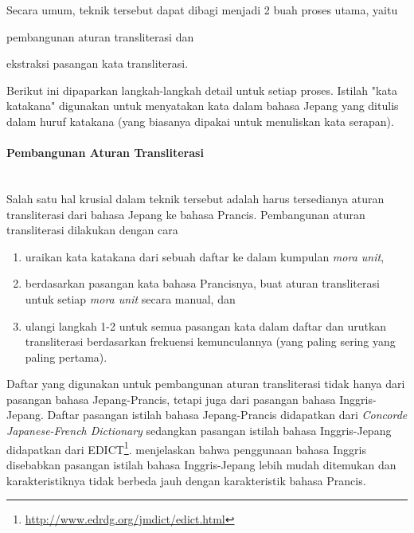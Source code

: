 \documentclass[../main/main.tex]{subfiles}
\begin{document}
Secara umum, teknik tersebut dapat dibagi menjadi 2 buah proses utama, yaitu
\begin{inparaenum}[(1)]
\item pembangunan aturan transliterasi dan
\item ekstraksi pasangan kata transliterasi.
\end{inparaenum}
Berikut ini dipaparkan langkah-langkah detail untuk setiap proses. Istilah "kata katakana" digunakan untuk menyatakan kata dalam bahasa Jepang yang ditulis dalam huruf katakana (yang biasanya dipakai untuk menuliskan kata serapan).

\paragraph{Pembangunan Aturan Transliterasi} ~\\
Salah satu hal krusial dalam teknik tersebut adalah harus tersedianya aturan transliterasi dari bahasa Jepang ke bahasa Prancis. Pembangunan aturan transliterasi dilakukan dengan cara
\begin{enumerate}
\item uraikan kata katakana dari sebuah daftar ke dalam kumpulan \textit{mora unit},
\item berdasarkan pasangan kata bahasa Prancisnya, buat aturan transliterasi untuk setiap \textit{mora unit} secara manual, dan
\item ulangi langkah 1-2 untuk semua pasangan kata dalam daftar dan urutkan transliterasi berdasarkan frekuensi kemunculannya (yang paling sering yang paling pertama).
\end{enumerate}

Daftar yang digunakan untuk pembangunan aturan transliterasi tidak hanya dari pasangan bahasa Jepang-Prancis, tetapi juga dari pasangan bahasa Inggris-Jepang. Daftar pasangan istilah bahasa Jepang-Prancis didapatkan dari \textit{Concorde Japanese-French Dictionary} sedangkan pasangan istilah bahasa Inggris-Jepang didapatkan dari EDICT\footnote{\url{http://www.edrdg.org/jmdict/edict.html}}. \textcite{tsuji} menjelaskan bahwa penggunaan bahasa Inggris disebabkan pasangan istilah bahasa Inggris-Jepang lebih mudah ditemukan dan karakteristiknya tidak berbeda jauh dengan karakteristik bahasa Prancis.
\end{document}
